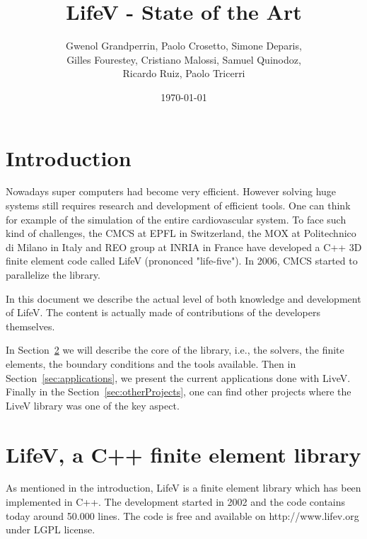 \documentclass[11pt]{article}
\begin{document}
\title{LifeV - State of the Art}
\author{Gwenol Grandperrin, Paolo Crosetto, Simone Deparis,\\
	Gilles Fourestey, Cristiano Malossi, Samuel Quinodoz, \\
	Ricardo Ruiz, Paolo Tricerri}
\date{\today}
\maketitle
\tableofcontents

\section{Introduction}
Nowadays super computers had become very efficient. However solving huge systems still requires research and development of efficient tools. One can think for example of the simulation of the entire cardiovascular system. To face such kind of challenges, the CMCS at EPFL in Switzerland, the MOX at Politechnico di Milano in Italy and REO group at INRIA in France have developed a C++ 3D finite element code called LifeV (prononced "life-five"). In 2006, CMCS started to parallelize the library.

In this document we describe the actual level of both knowledge and development of LifeV. The content is actually made of contributions of the developers themselves.

In Section~\ref{sec:lifev} we will describe the core of the library, i.e., the solvers, the finite elements, the boundary conditions and the tools available. Then in Section~\ref{sec:applications}, we present the current applications done with LiveV. Finally in the Section~\ref{sec:otherProjects}, one can find other projects where the LiveV library was one of the key aspect.

\section{LifeV, a C++ finite element library}
\label{sec:lifev}

As mentioned in the introduction, LifeV is a finite element library which has been implemented in C++. The development started in 2002 and the code contains today around 50.000 lines. The code is free and available on http://www.lifev.org under LGPL license.
\end{document}
